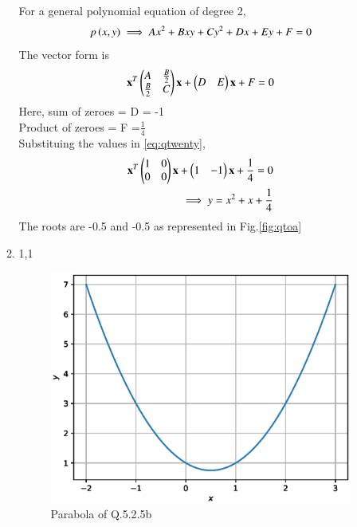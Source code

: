 \begin{enumerate}[label=\thesection.\arabic*.,ref=\thesection.\theenumi]
\begin{enumerate}
		\solution For a general polynomial equation of degree 2,
	\begin{align}
	p\left(x,y\right) \implies Ax^2 +Bxy + Cy^2 +Dx + Ey + F = 0
	\end{align}
	The vector form is
	\begin{align}
	\mathbf{x}^T\begin{pmatrix}A&\frac{B}{2}\\\frac{B}{2}&C\end{pmatrix}\mathbf{x}  + \begin{pmatrix}D&E\end{pmatrix}\mathbf{x} + F = 0 \label{eq:qtwenty}
	\end{align}
Here, sum of zeroes = D = -1\\
Product of zeroes = F =$\frac{1}{4}$\\
Substituing the values in \ref{eq:qtwenty},\\
\begin{align}
\mathbf{x}^T\begin{pmatrix}1&0\\0&0\end{pmatrix}\mathbf{x}  + \begin{pmatrix}1&-1\end{pmatrix}\mathbf{x} +\frac{1}{4} = 0\\
\implies y = x^2 + x + \frac{1}{4}
\end{align}
The roots are -0.5 and -0.5 as represented in Fig.\ref{fig:qtoa}
		
		\item 1,1
	\begin{figure}[!ht]
	\centering
	\includegraphics[width=\columnwidth]{./figs/conics/q20b.eps}
	\caption{Parabola of Q.5.2.5b}
	\label{fig:qtob}	
	\end{figure}
	

\end{enumerate}
\end{enumerate}
